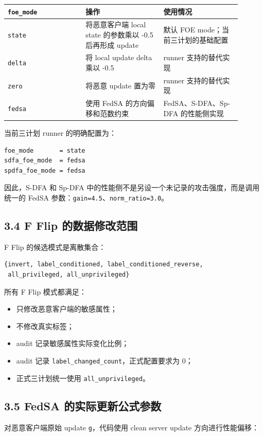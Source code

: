 \documentclass[UTF8,a4paper,10pt]{ctexart}
\begin{document}
{\small
\renewcommand{\arraystretch}{1.18}
\begin{longtable}{|p{0.300\linewidth}|p{0.300\linewidth}|p{0.300\linewidth}|}
\hline
\texttt{foe\_mode} & 操作 & 使用情况 \\\hline
\endhead
\texttt{state} & 将恶意客户端 local state 的参数乘以 -0.5 后再形成 update & 默认 FOE mode；当前三计划的基础配置 \\\hline
\texttt{delta} & 将 local update delta 乘以 -0.5 & runner 支持的替代实现 \\\hline
\texttt{zero} & 将恶意 update 置为零 & runner 支持的替代实现 \\\hline
\texttt{fedsa} & 使用 FedSA 的方向偏移和范数约束 & FedSA、S-DFA、Sp-DFA 的性能侧实现 \\\hline
\end{longtable}
}
当前三计划 runner 的明确配置为：

\begin{lstlisting}
foe_mode       = state
sdfa_foe_mode  = fedsa
spdfa_foe_mode = fedsa
\end{lstlisting}
因此，S-DFA 和 Sp-DFA 中的性能侧不是另设一个未记录的攻击强度，而是调用统一的 FedSA 参数：\texttt{gain=4.5}、\texttt{norm\_ratio=3.0}。

\subsection{3.4 F Flip 的数据修改范围}
F Flip 的候选模式是离散集合：

\begin{lstlisting}
{invert, label_conditioned, label_conditioned_reverse,
 all_privileged, all_unprivileged}
\end{lstlisting}
所有 F Flip 模式都满足：

\begin{itemize}
\item 只修改恶意客户端的敏感属性；
\item 不修改真实标签；
\item audit 记录敏感属性实际变化比例；
\item audit 记录 \texttt{label\_changed\_count}，正式配置要求为 0；
\item 正式三计划统一使用 \texttt{all\_unprivileged}。
\end{itemize}
\subsection{3.5 FedSA 的实际更新公式参数}
对恶意客户端原始 update \texttt{g}，代码使用 clean server update 方向进行性能偏移：
\end{document}
